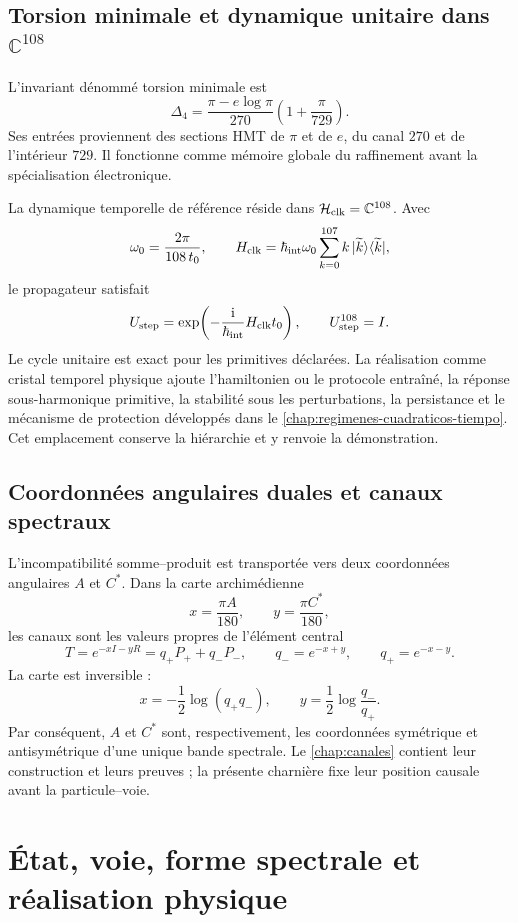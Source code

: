 \subsection{Torsion minimale et dynamique unitaire dans \texorpdfstring{\(\mathbb C^{108}\)}{C108}}

L'invariant dénommé torsion minimale est
\[
 \Delta_4
 =
 \frac{\pi-e\log\pi}{270}
 \left(1+\frac{\pi}{729}\right).
\]
Ses entrées proviennent des sections HMT de \(\pi\) et de \(e\), du canal
\(270\) et de l'intérieur \(729\). Il fonctionne comme mémoire globale du
raffinement avant la spécialisation électronique.

La dynamique temporelle de référence réside dans
\(\mathcal H_{\rm clk}=\mathbb C^{108}\). Avec
\[
 \omega_0=\frac{2\pi}{108\,t_0},
 \qquad
 H_{\rm clk}
 =\hbar_{\rm int}\omega_0
 \sum_{k=0}^{107}k\,|\widetilde k\rangle
 \langle\widetilde k|,
\]
le propagateur satisfait
\[
 U_{\rm step}
 =\exp\!\left(-\frac{\mathrm i}{\hbar_{\rm int}}
 H_{\rm clk}t_0\right),
 \qquad
 U_{\rm step}^{108}=I.
\]
Le cycle unitaire est exact pour les primitives déclarées. La réalisation
comme cristal temporel physique ajoute l'hamiltonien ou le protocole entraîné,
la réponse sous-harmonique primitive, la stabilité sous les perturbations, la
persistance et le mécanisme de protection développés dans le
\cref{chap:regimenes-cuadraticos-tiempo}. Cet emplacement conserve la
hiérarchie et y renvoie la démonstration.

\subsection{Coordonnées angulaires duales et canaux spectraux}

L'incompatibilité somme--produit est transportée vers deux coordonnées angulaires
\(A\) et \(C^*\). Dans la carte archimédienne
\[
 x=\frac{\pi A}{180},
 \qquad
 y=\frac{\pi C^*}{180},
\]
les canaux sont les valeurs propres de l'élément central
\[
 T=e^{-xI-yR}=q_+P_++q_-P_-,
 \qquad
 q_-=e^{-x+y},
 \qquad
 q_+=e^{-x-y}.
\]
La carte est inversible :
\[
 x=-\frac12\log(q_+q_-),
 \qquad
 y=\frac12\log\frac{q_-}{q_+}.
\]
Par conséquent, \(A\) et \(C^*\) sont, respectivement, les coordonnées symétrique et
antisymétrique d'une unique bande spectrale. Le
\cref{chap:canales} contient leur construction et leurs preuves ; la
présente charnière fixe leur position causale avant la particule--voie.

\section{État, voie, forme spectrale et réalisation physique}


